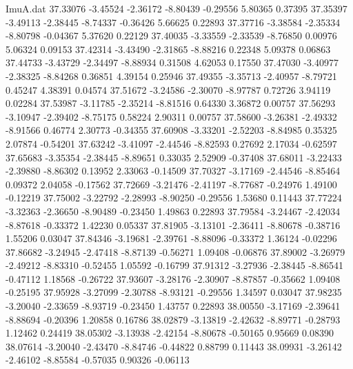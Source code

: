 \begin{filecontents}{ImuA.dat}
  37.33076   -3.45524   -2.36172   -8.80439   -0.29556    5.80365    0.37395
  37.35397   -3.49113   -2.38445   -8.74337   -0.36426    5.66625    0.22893
  37.37716   -3.38584   -2.35334   -8.80798   -0.04367    5.37620    0.22129
  37.40035   -3.33559   -2.33539   -8.76850    0.00976    5.06324    0.09153
  37.42314   -3.43490   -2.31865   -8.88216    0.22348    5.09378    0.06863
  37.44733   -3.43729   -2.34497   -8.88934    0.31508    4.62053    0.17550
  37.47030   -3.40977   -2.38325   -8.84268    0.36851    4.39154    0.25946
  37.49355   -3.35713   -2.40957   -8.79721    0.45247    4.38391    0.04574
  37.51672   -3.24586   -2.30070   -8.97787    0.72726    3.94119    0.02284
  37.53987   -3.11785   -2.35214   -8.81516    0.64330    3.36872    0.00757
  37.56293   -3.10947   -2.39402   -8.75175    0.58224    2.90311    0.00757
  37.58600   -3.26381   -2.49332   -8.91566    0.46774    2.30773   -0.34355
  37.60908   -3.33201   -2.52203   -8.84985    0.35325    2.07874   -0.54201
  37.63242   -3.41097   -2.44546   -8.82593    0.27692    2.17034   -0.62597
  37.65683   -3.35354   -2.38445   -8.89651    0.33035    2.52909   -0.37408
  37.68011   -3.22433   -2.39880   -8.86302    0.13952    2.33063   -0.14509
  37.70327   -3.17169   -2.44546   -8.85464    0.09372    2.04058   -0.17562
  37.72669   -3.21476   -2.41197   -8.77687   -0.24976    1.49100   -0.12219
  37.75002   -3.22792   -2.28993   -8.90250   -0.29556    1.53680    0.11443
  37.77224   -3.32363   -2.36650   -8.90489   -0.23450    1.49863    0.22893
  37.79584   -3.24467   -2.42034   -8.87618   -0.33372    1.42230    0.05337
  37.81905   -3.13101   -2.36411   -8.80678   -0.38716    1.55206    0.03047
  37.84346   -3.19681   -2.39761   -8.88096   -0.33372    1.36124   -0.02296
  37.86682   -3.24945   -2.47418   -8.87139   -0.56271    1.09408   -0.06876
  37.89002   -3.26979   -2.49212   -8.83310   -0.52455    1.05592   -0.16799
  37.91312   -3.27936   -2.38445   -8.86541   -0.47112    1.18568   -0.26722
  37.93607   -3.28176   -2.30907   -8.87857   -0.35662    1.09408   -0.25195
  37.95928   -3.27099   -2.30788   -8.93121   -0.29556    1.34597    0.03047
  37.98235   -3.20040   -2.33659   -8.93719   -0.23450    1.43757    0.22893
  38.00550   -3.17169   -2.39641   -8.88694   -0.20396    1.20858    0.16786
  38.02879   -3.13819   -2.42632   -8.89771   -0.28793    1.12462    0.24419
  38.05302   -3.13938   -2.42154   -8.80678   -0.50165    0.95669    0.08390
  38.07614   -3.20040   -2.43470   -8.84746   -0.44822    0.88799    0.11443
  38.09931   -3.26142   -2.46102   -8.85584   -0.57035    0.90326   -0.06113

\end{filecontents}
